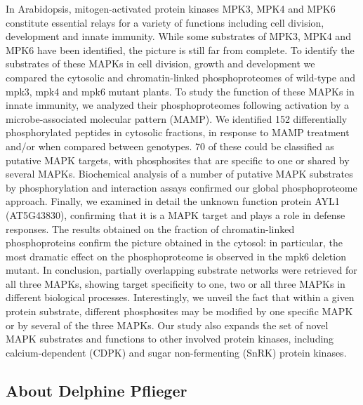 \documentclass[12pt,]{book}
\theoremstyle{definition}
\theoremstyle{definition}
\theoremstyle{remark}
\begin{document}
In Arabidopsis, mitogen-activated protein kinases MPK3, MPK4 and MPK6
constitute essential relays for a variety of functions including cell
division, development and innate immunity. While some substrates of
MPK3, MPK4 and MPK6 have been identified, the picture is still far from
complete. To identify the substrates of these MAPKs in cell division,
growth and development we compared the cytosolic and chromatin-linked
phosphoproteomes of wild-type and mpk3, mpk4 and mpk6 mutant plants. To
study the function of these MAPKs in innate immunity, we analyzed their
phosphoproteomes following activation by a microbe-associated molecular
pattern (MAMP). We identified 152 differentially phosphorylated peptides
in cytosolic fractions, in response to MAMP treatment and/or when
compared between genotypes. 70 of these could be classified as putative
MAPK targets, with phosphosites that are specific to one or shared by
several MAPKs. Biochemical analysis of a number of putative MAPK
substrates by phosphorylation and interaction assays confirmed our
global phosphoproteome approach. Finally, we examined in detail the
unknown function protein AYL1 (AT5G43830), confirming that it is a MAPK
target and plays a role in defense responses. The results obtained on
the fraction of chromatin-linked phosphoproteins confirm the picture
obtained in the cytosol: in particular, the most dramatic effect on the
phosphoproteome is observed in the mpk6 deletion mutant. In conclusion,
partially overlapping substrate networks were retrieved for all three
MAPKs, showing target specificity to one, two or all three MAPKs in
different biological processes. Interestingly, we unveil the fact that
within a given protein substrate, different phosphosites may be modified
by one specific MAPK or by several of the three MAPKs. Our study also
expands the set of novel MAPK substrates and functions to other involved
protein kinases, including calcium-dependent (CDPK) and sugar
non-fermenting (SnRK) protein kinases.

\subsection*{About Delphine Pflieger}\label{about-delphine-pflieger}
\end{document}
